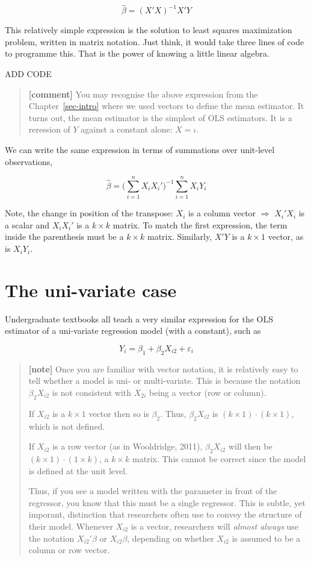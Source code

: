\documentclass[
  letterpaper,
  DIV=11,
  numbers=noendperiod]{scrreprt}
\begin{document}
\[ \hat{\beta} = (X'X)^{-1}X'Y \]

This relatively simple expression is the solution to least squares
maximization problem, written in matrix notation. Just think, it would
take three lines of code to programme this. That is the power of knowing
a little linear algebra.

ADD CODE

\begin{quote}
\textbf{{[}comment{]}} You may recognise the above expression from the
Chapter~\ref{sec-intro} where we used vectors to define the mean
estimator. It turns out, the mean estimator is the simplest of OLS
estimators. It is a reression of \(Y\) against a constant alone:
\(X=\iota\).
\end{quote}

We can write the same expression in terms of summations over unit-level
observations,

\[ \hat{\beta} = \big(\sum_{i=1}^nX_iX_i')^{-1}\sum_{i=1}^nX_iY_i \]

Note, the change in position of the transpose: \(X_i\) is a column
vector \(\Rightarrow\) \(X_i'X_i\) is a scalar and \(X_iX_i'\) is a
\(k\times k\) matrix. To match the first expression, the term inside the
parenthesis must be a \(k\times k\) matrix. Similarly, \(X'Y\) is a
\(k\times 1\) vector, as is \(X_iY_i\).

\hypertarget{the-uni-variate-case}{%
\section{The uni-variate case}\label{the-uni-variate-case}}

Undergraduate textbooks all teach a very similar expression for the OLS
estimator of a uni-variate regression model (with a constant), such as

\[
Y_i = \beta_1+\beta_2X_{i2}+\varepsilon_i
\]

\begin{quote}
\textbf{{[}note{]}} Once you are familiar with vector notation, it is
relatively easy to tell whether a model is uni- or multi-variate. This
is because the notation \(\beta_2 X_{i2}\) is not consistent with
\(X_{2i}\) being a vector (row or column).

If \(X_{i2}\) is a \(k\times 1\) vector then so is \(\beta_2\). Thus,
\(\beta_2 X_{i2}\) is \((k\times 1)\cdot (k\times1)\), which is not
defined.

If \(X_{i2}\) is a row vector (as in Wooldridge, 2011),
\(\beta_2 X_{i2}\) will then be \((k\times 1)\cdot (1\times k)\), a
\(k\times k\) matrix. This cannot be correct since the model is defined
at the unit level.

Thus, if you see a model written with the parameter in front of the
regressor, you know that this must be a single regressor. This is
subtle, yet imporant, distinction that researchers often use to convey
the structure of their model. Whenever \(X_{i2}\) is a vector,
researchers will \emph{almost always} use the notation \(X_{i2}'\beta\)
or \(X_{i2}\beta\), depending on whether \(X_{i2}\) is assumed to be a
column or row vector.
\end{quote}
\end{document}
